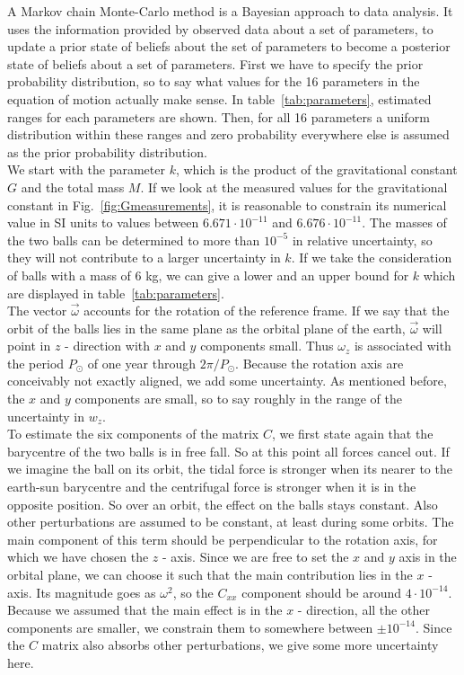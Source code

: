 \documentclass[prb,preprint]{revtex4-1}
\begin{document}
A Markov chain Monte-Carlo method is a Bayesian approach to data analysis. It uses the information provided by observed data about a set of parameters, to update a prior state of beliefs about the set of parameters to become a posterior state of beliefs about a set of parameters. First we have to specify the prior probability distribution, so to say what values for the 16 parameters in the equation of motion actually make sense. In table~\ref{tab:parameters}, estimated ranges for each parameters are shown. Then, for all 16 parameters a uniform distribution within these ranges and zero probability everywhere else is assumed as the prior probability distribution. \\

We start with the parameter $k$, which is the product of the gravitational constant $G$ and the total mass $M$. If we look at the measured values for the gravitational constant in Fig.~\ref{fig:Gmeasurements}, it is reasonable to constrain its numerical value in SI units to values between $6.671 \cdot 10^{-11}$ and $6.676 \cdot 10^{-11}$. The masses of the two balls can be determined to more than $10^{-5}$ in relative uncertainty, so they will not contribute to a larger uncertainty in $k$. If we take the consideration of balls with a mass of 6 kg, we can give a lower and an upper bound for $k$ which are displayed in table~\ref{tab:parameters}.\\

The vector $\vec{\omega}$ accounts for the rotation of the reference frame. If we say that the orbit of the balls lies in the same plane as the orbital plane of the earth, $\vec{\omega}$ will point in $z$ - direction with $x$ and $y$ components small. Thus $\omega_z$ is associated with the period $P_\odot$ of one year through $2\pi/P_\odot$. Because the rotation axis are conceivably not exactly aligned, we add some uncertainty. As mentioned before, the $x$ and $y$ components are small, so to say roughly in the range of the uncertainty in $w_z$.\\

To estimate the six components of the matrix $C$, we first state again that the barycentre of the two balls is in free fall. So at this point all forces cancel out. If we imagine the ball on its orbit, the tidal force is stronger when its nearer to the earth-sun barycentre and the centrifugal force is stronger when it is in the opposite position. So over an orbit, the effect on the balls stays constant. Also other perturbations are assumed to be constant, at least during some orbits.
The main component of this term should be perpendicular to the rotation axis, for which we have chosen the $z$ - axis. Since we are free to set the $x$ and $y$ axis in the orbital plane, we can choose it such that the main contribution lies in the $x$ - axis. Its magnitude goes as $\omega^2$, so the $C_{xx}$ component should be around $4 \cdot 10^{-14}$. Because we assumed that the main effect is in the $x$ - direction, all the other components are smaller, we constrain them to somewhere between $\pm 10^{-14}$. Since the $C$ matrix also absorbs other perturbations, we give some more uncertainty here. \\
\end{document}
